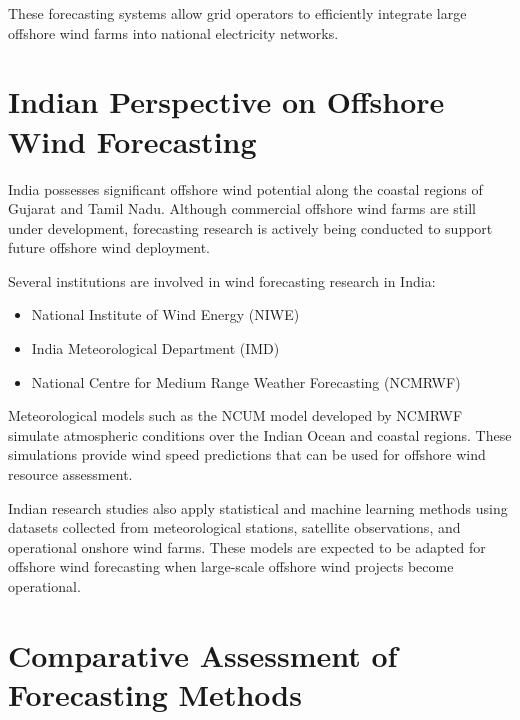 \documentclass[12pt,a4paper]{article}
\begin{document}
These forecasting systems allow grid operators to efficiently integrate large offshore wind farms into national electricity networks.

\section{Indian Perspective on Offshore Wind Forecasting}

India possesses significant offshore wind potential along the coastal regions of Gujarat and Tamil Nadu. Although commercial offshore wind farms are still under development, forecasting research is actively being conducted to support future offshore wind deployment.

Several institutions are involved in wind forecasting research in India:

\begin{itemize}
\item National Institute of Wind Energy (NIWE)
\item India Meteorological Department (IMD)
\item National Centre for Medium Range Weather Forecasting (NCMRWF)
\end{itemize}

Meteorological models such as the NCUM model developed by NCMRWF simulate atmospheric conditions over the Indian Ocean and coastal regions. These simulations provide wind speed predictions that can be used for offshore wind resource assessment.

Indian research studies also apply statistical and machine learning methods using datasets collected from meteorological stations, satellite observations, and operational onshore wind farms. These models are expected to be adapted for offshore wind forecasting when large-scale offshore wind projects become operational.

\section{Comparative Assessment of Forecasting Methods}
\end{document}
